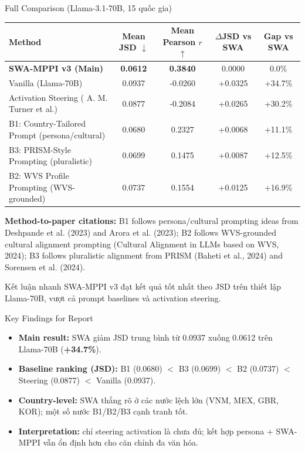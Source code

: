 \documentclass[11pt, aspectratio=169]{beamer}
\begin{document}
\begin{frame}{Full Comparison (Llama-3.1-70B, 15 quốc gia)}
    \begin{table}
    \centering \scriptsize
    \begin{tabular}{@{}l c c c c@{}}
    \toprule
    \textbf{Method} & \textbf{Mean JSD $\downarrow$} & \textbf{Mean Pearson $r$ $\uparrow$} & \textbf{$\Delta$JSD vs SWA} & \textbf{Gap vs SWA} \\
    \midrule
    \rowcolor{lightgray}
    \textbf{SWA-MPPI v3 (Main)} & \textbf{0.0612} & \textbf{0.3840} & 0.0000 & 0.0\% \\
    Vanilla (Llama-70B) & 0.0937 & -0.0260 & +0.0325 & +34.7\% \\
    Activation Steering ( A. M. Turner et al.) & 0.0877 & -0.2084 & +0.0265 & +30.2\% \\
    B1: Country-Tailored Prompt (persona/cultural) & 0.0680 & 0.2327 & +0.0068 & +11.1\% \\
    B3: PRISM-Style Prompting (pluralistic) & 0.0699 & 0.1475 & +0.0087 & +12.5\% \\
    B2: WVS Profile Prompting (WVS-grounded) & 0.0737 & 0.1554 & +0.0125 & +16.9\% \\
    \bottomrule
    \end{tabular}
    \end{table}
    {\tiny
    \textbf{Method-to-paper citations:}
    B1 follows persona/cultural prompting ideas from Deshpande et al. (2023) and Arora et al. (2023);
    B2 follows WVS-grounded cultural alignment prompting (Cultural Alignment in LLMs based on WVS, 2024);
    B3 follows pluralistic alignment from PRISM (Baheti et al., 2024) and Sorensen et al. (2024).}
    \begin{block}{Kết luận nhanh}
        SWA-MPPI v3 đạt kết quả tốt nhất theo JSD trên thiết lập Llama-70B, vượt cả prompt baselines và activation steering.
    \end{block}
\end{frame}

\begin{frame}{Key Findings for Report}
    \begin{itemize}
        \item \textbf{Main result:} SWA giảm JSD trung bình từ 0.0937 xuống 0.0612 trên Llama-70B (\textbf{+34.7\%}).
        \item \textbf{Baseline ranking (JSD):} B1 (0.0680) $<$ B3 (0.0699) $<$ B2 (0.0737) $<$ Steering (0.0877) $<$ Vanilla (0.0937).
        \item \textbf{Country-level:} SWA thắng rõ ở các nước lệch lớn (VNM, MEX, GBR, KOR); một số nước B1/B2/B3 cạnh tranh tốt.
        \item \textbf{Interpretation:} chỉ steering activation là chưa đủ; kết hợp persona + SWA-MPPI vẫn ổn định hơn cho căn chỉnh đa văn hóa.
    \end{itemize}
\end{frame}
\end{document}

